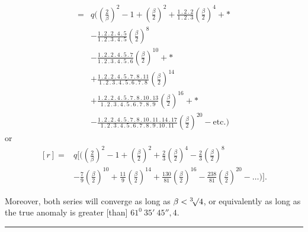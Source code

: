 \[
\begin{aligned}
={}&q\Biggl(\left(\frac2\beta\right)^2-1+\left(\frac\beta2\right)^2
+\frac{1\mathpunct{.}2\mathpunct{.}2}{1\mathpunct{.}2\mathpunct{.}3}\left(\frac\beta2\right)^4+\ast\\
&-\frac{1\mathpunct{.}2\mathpunct{.}2\mathpunct{.}4\mathpunct{.}5}{1\mathpunct{.}2\mathpunct{.}3\mathpunct{.}4\mathpunct{.}5}\left(\frac\beta2\right)^8\\
&-\frac{1\mathpunct{.}2\mathpunct{.}2\mathpunct{.}4\mathpunct{.}5\mathpunct{.}7}{1\mathpunct{.}2\mathpunct{.}3\mathpunct{.}4\mathpunct{.}5\mathpunct{.}6}\left(\frac\beta2\right)^{10}+\ast\\
&+\frac{1\mathpunct{.}2\mathpunct{.}2\mathpunct{.}4\mathpunct{.}5\mathpunct{.}7\mathpunct{.}8\mathpunct{.}11}{1\mathpunct{.}2\mathpunct{.}3\mathpunct{.}4\mathpunct{.}5\mathpunct{.}6\mathpunct{.}7\mathpunct{.}8}\left(\frac\beta2\right)^{14}\\
&+\frac{1\mathpunct{.}2\mathpunct{.}2\mathpunct{.}4\mathpunct{.}5\mathpunct{.}7\mathpunct{.}8\mathpunct{.}10\mathpunct{.}13}{1\mathpunct{.}2\mathpunct{.}3\mathpunct{.}4\mathpunct{.}5\mathpunct{.}6\mathpunct{.}7\mathpunct{.}8\mathpunct{.}9}\left(\frac\beta2\right)^{16}+\ast\\
&-\frac{1\mathpunct{.}2\mathpunct{.}2\mathpunct{.}4\mathpunct{.}5\mathpunct{.}7\mathpunct{.}8\mathpunct{.}10\mathpunct{.}11\mathpunct{.}14\mathpunct{.}17}{1\mathpunct{.}2\mathpunct{.}3\mathpunct{.}4\mathpunct{.}5\mathpunct{.}6\mathpunct{.}7\mathpunct{.}8\mathpunct{.}9\mathpunct{.}10\mathpunct{.}11}\left(\frac\beta2\right)^{20}-\text{etc.}\Biggr)
\end{aligned}
\]
or
\[
\begin{aligned}
[r]={}&q\Biggl[\Biggl(\left(\frac2\beta\right)^2-1+\left(\frac\beta2\right)^2
+\frac23\left(\frac\beta2\right)^4-\frac23\left(\frac\beta2\right)^8\\
&-\frac79\left(\frac\beta2\right)^{10}+\frac{11}{9}\left(\frac\beta2\right)^{14}+\frac{130}{81}\left(\frac\beta2\right)^{16}
-\frac{238}{81}\left(\frac\beta2\right)^{20}-\ldots\Biggr)\Biggr].
\end{aligned}
\]
\par
Moreover, both series will converge as long as \(\beta<\BareRoot[3]{4}\), or equivalently as long as the true anomaly is greater [than] \(61^0\ 35'\ 45''{,}4\).
\par\medskip
\begin{center}\rule{.18\textwidth}{.35pt}\end{center}
